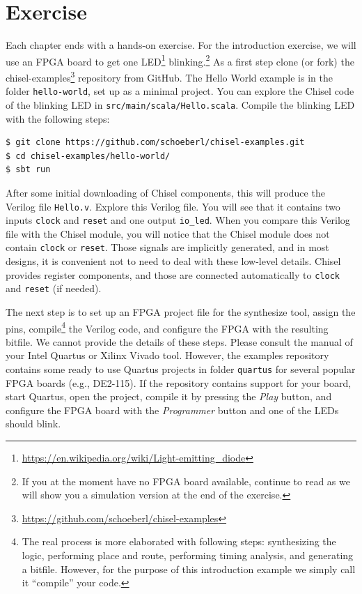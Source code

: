 \documentclass[%
    10pt,
    headinclude, footexclude,
    openright, %
    notitlepage,
    cleardoubleempty,
    headsepline,
    pointlessnumbers,
    bibtotoc, idxtotoc,
    ]{scrbook}
\newcommand{\code}[1]{{\small{\texttt{#1}}}}
\newcommand{\myref}[2]{\href{#1}{#2}}
\renewcommand{\myref}[2]{{#2}{\footnote{\url{#1}}}}
\begin{document}
\section{Exercise}

Each chapter ends with a hands-on exercise. For the introduction exercise, we will use an
FPGA board to get one \myref{https://en.wikipedia.org/wiki/Light-emitting_diode}{LED}
blinking.\footnote{If you at the moment have no FPGA board available, continue to read
as we will show you a simulation version at the end of the exercise.}
As a first step clone (or fork) the \myref{https://github.com/schoeberl/chisel-examples}{chisel-examples}
repository from GitHub.
The Hello World example is in the folder \code{hello-world}, set up as
a minimal project. You can explore the Chisel code of the blinking LED
in \code{src/main/scala/Hello.scala}.
Compile the blinking LED with the following steps:

\begin{verbatim}
$ git clone https://github.com/schoeberl/chisel-examples.git
$ cd chisel-examples/hello-world/
$ sbt run
\end{verbatim}

After some initial downloading of Chisel components, this will produce the Verilog file \code{Hello.v}.
Explore this Verilog file. You will see that it contains two inputs \code{clock} and \code{reset}
and one output \code{io\_led}. When you compare this Verilog file with the Chisel module,
you will notice that the Chisel module does not contain \code{clock} or \code{reset}.
Those signals are implicitly generated, and in most designs, it is convenient not to need to
deal with these low-level details. Chisel provides register components, and those
are connected automatically to \code{clock} and \code{reset} (if needed).

The next step is to set up an FPGA project file for the synthesize tool, assign the pins,
compile\footnote{The real process is more elaborated with following steps: synthesizing the logic,
performing place and route, performing timing analysis, and generating a bitfile.
However, for the purpose of this introduction example we simply call it ``compile''
your code.} the Verilog code, and configure the FPGA with the resulting bitfile.
We cannot provide the details of these steps. Please consult the manual of
your Intel Quartus or Xilinx Vivado tool.
However, the examples repository contains some ready to use Quartus
projects in folder \code{quartus} for several popular FPGA boards (e.g., DE2-115).
If the repository contains support for your board, start Quartus, open the project,
compile it by pressing the \emph{Play} button, and configure the FPGA board
with the \emph{Programmer} button and one of the LEDs should blink.
\end{document}
